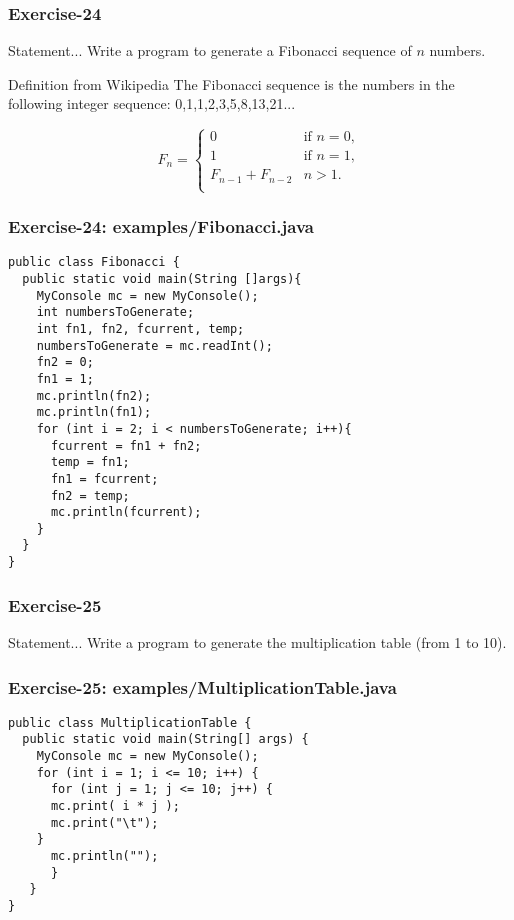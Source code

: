 \documentclass[xcolor=dvipsnames,dvip,notes=show,handout,table]{beamer}
\begin{document}
\begin{frame}[fragile]
\frametitle{Exercise-24}
\begin{block}{Statement...}
Write a program to generate a Fibonacci sequence of $n$ numbers.
\end{block}
% 
\begin{exampleblock}{Definition from Wikipedia}
The Fibonacci sequence is the numbers in the following integer sequence:
0,1,1,2,3,5,8,13,21...
\end{exampleblock}


\begin{equation}
F_n = \begin{cases}
0 & \text{if } n = 0, \\
1 & \text{if } n = 1, \\
F_{n-1} + F_{n-2} & n > 1.\\
\end{cases}
\end{equation}



\end{frame}


\begin{frame}[fragile]
\frametitle{Exercise-24: examples/Fibonacci.java}
\scriptsize
\begin{lstlisting}
public class Fibonacci {
  public static void main(String []args){
    MyConsole mc = new MyConsole();
    int numbersToGenerate;
    int fn1, fn2, fcurrent, temp;
    numbersToGenerate = mc.readInt();
    fn2 = 0;
    fn1 = 1;
    mc.println(fn2);
    mc.println(fn1);
    for (int i = 2; i < numbersToGenerate; i++){
      fcurrent = fn1 + fn2;
      temp = fn1;
      fn1 = fcurrent;
      fn2 = temp;
      mc.println(fcurrent);
    }
  }
}
\end{lstlisting}
\end{frame}

\begin{frame}[fragile]
\frametitle{Exercise-25}
\begin{block}{Statement...}
Write a program to generate the multiplication table (from 1 to 10).
\end{block}
% 
\end{frame}

\begin{frame}[fragile]
\frametitle{Exercise-25: examples/MultiplicationTable.java}
\scriptsize
\begin{lstlisting}
public class MultiplicationTable {
  public static void main(String[] args) {
    MyConsole mc = new MyConsole();
    for (int i = 1; i <= 10; i++) {
      for (int j = 1; j <= 10; j++) {
	  mc.print( i * j );
	  mc.print("\t");
	}
      mc.println("");
      }
   }
}
\end{lstlisting}
\end{frame}
\end{document}

